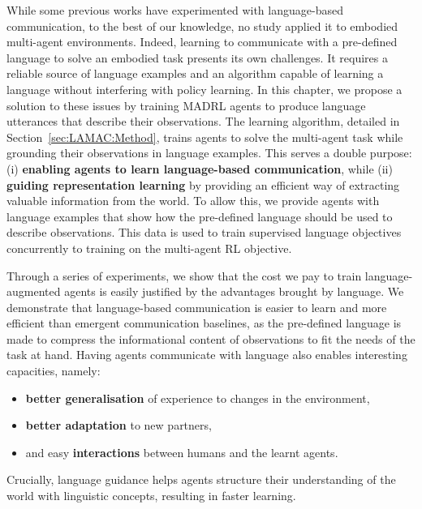 While some previous works have experimented with language-based communication, to the best of our knowledge, no study applied it to embodied multi-agent environments. Indeed, learning to communicate with a pre-defined language to solve an embodied task presents its own challenges. It requires a reliable source of language examples and an algorithm capable of learning a language without interfering with policy learning. In this chapter, we propose a solution to these issues by training MADRL agents to produce language utterances that describe their observations. 
The learning algorithm, detailed in Section~\ref{sec:LAMAC:Method}, trains agents to solve the multi-agent task while grounding their observations in language examples. This serves a double purpose: (i) \textbf{enabling agents to learn language-based communication}, while (ii) \textbf{guiding representation learning} by providing an efficient way of extracting valuable information from the world. To allow this, we provide agents with language examples that show how the pre-defined language should be used to describe observations. This data is used to train supervised language objectives concurrently to training on the multi-agent RL objective.  

Through a series of experiments, we show that the cost we pay to train language-augmented agents is easily justified by the advantages brought by language. We demonstrate that language-based communication is easier to learn and more efficient than emergent communication baselines, as the pre-defined language is made to compress the informational content of observations to fit the needs of the task at hand. Having agents communicate with language also enables interesting capacities, namely:
\begin{itemize}
    \item \textbf{better generalisation} of experience to changes in the environment,
    \item \textbf{better adaptation} to new partners,
    \item and easy \textbf{interactions} between humans and the learnt agents.
\end{itemize}
Crucially, language guidance helps agents structure their understanding of the world with linguistic concepts, resulting in faster learning. 


